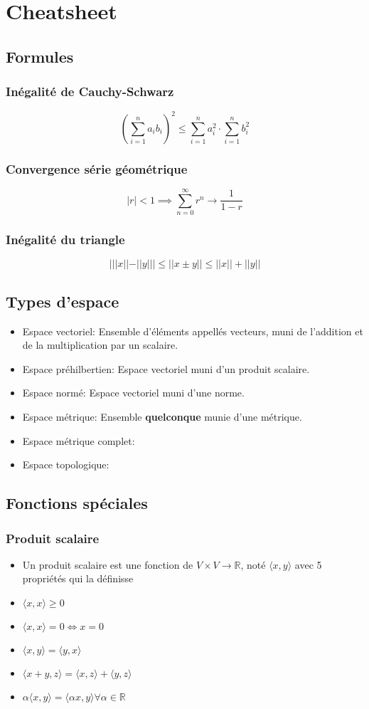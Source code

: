 \documentclass[12pt]{book}
\let\Bbb\mathbb
\theoremstyle{definition}
\begin{document}
\chapter{Cheatsheet}
\section{Formules}
\subsection{Inégalité de Cauchy-Schwarz}
$$(\sum_{i=1}^{n} a_ib_i)^2 \leq \sum_{i=1}^{n} a_i^2 \cdot \sum_{i=1}^{n} b_i ^ 2$$ 
\subsection{Convergence série géométrique}
$$|r| < 1 \implies \sum_{n=0}^{\infty} r^n \to \frac{1}{1 - r} $$
\subsection{Inégalité du triangle}
$$| ||x|| - ||y|| | \leq ||x \pm y|| \leq ||x|| + ||y|| $$
\section{Types d'espace}
\begin{itemize}
    \item Espace vectoriel: Ensemble d'éléments appellés vecteurs, muni de l'addition et de la multiplication par un scalaire.
    \item Espace préhilbertien: Espace vectoriel muni d'un produit scalaire.
    \item Espace normé: Espace vectoriel muni d'une norme.
    \item Espace métrique: Ensemble \textbf{quelconque} munie d'une métrique.
    \item Espace métrique complet:
    \item Espace topologique:
\end{itemize}
\section{Fonctions spéciales}
\subsection{Produit scalaire}
\begin{itemize}
    \item Un produit scalaire est une fonction de $V \times V \to \Bbb R$, noté $\langle x, y \rangle$ avec 5 propriétés qui la définisse
    \item $\langle x, x \rangle \geq 0$
    \item $\langle x, x \rangle = 0 \iff x = 0$
    \item $\langle x, y \rangle = \langle y, x \rangle$
    \item $\langle x + y, z\rangle = \langle x, z \rangle + \langle y, z \rangle$
    \item $\alpha\langle x, y \rangle = \langle \alpha x, y \rangle \forall \alpha \in \Bbb R$
\end{itemize}
\end{document}
